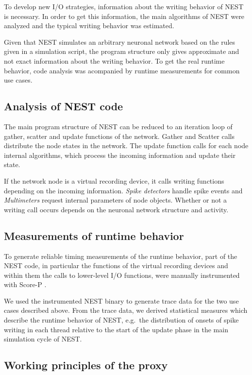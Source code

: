 \documentclass[]{YIC2015}
\begin{document}
To develop new I/O strategies, information about the writing behavior
of NEST is necessary. In order to get this information, the main
algorithms of NEST were analyzed and the typical writing behavior was
estimated.

Given that NEST simulates an arbitrary neuronal network based on the
rules given in a simulation script, the program structure only gives
approximate and not exact information about the writing behavior. To
get the real runtime behavior, code analysis was acompanied by runtime
measurements for common use cases.

\subsection{Analysis of NEST code}

The main program structure of NEST can be reduced to an iteration loop
of gather, scatter and update functions of the network. Gather and
Scatter calls distribute the node states in the network. The update
function calls for each node internal algorithms, which process the
incoming information and update their state.

If the network node is a virtual recording device, it calls writing
functions depending on the incoming information. \emph{Spike
  detectors} handle spike events and \emph{Multimeters} request
internal parameters of node objects. Whether or not a writing call
occurs depends on the neuronal network structure and activity.

\subsection{Measurements of runtime behavior}

To generate reliable timing measurements of the runtime behavior, part
of the NEST code, in particular the functions of the virtual recording
devices and within them the calls to lower-level I/O functions, were
manually instrumented with Score-P \cite{ScoreP}.

We used the instrumented NEST binary to generate trace data for the
two use cases described above. From the trace data, we derived
statistical measures which describe the runtime behavior of NEST,
e.g.~the distribution of onsets of spike writing in each thread
relative to the start of the update phase in the main simulation cycle
of NEST.

\subsection{Working principles of the proxy}
\end{document}
